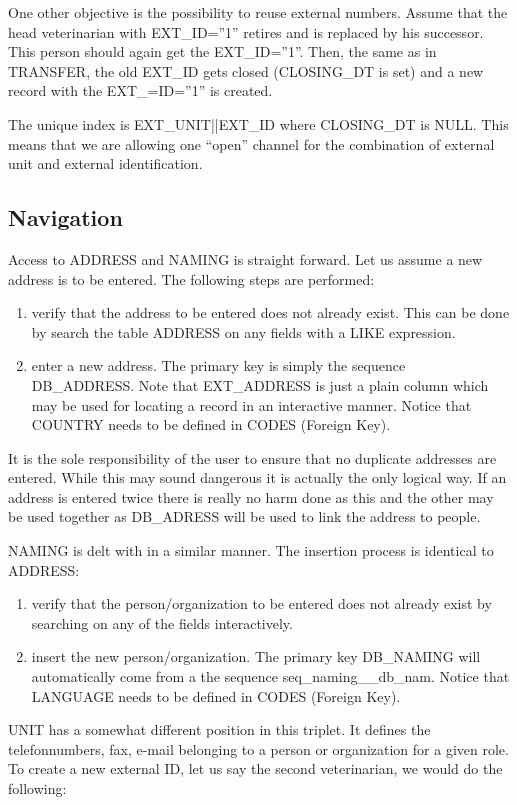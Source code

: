 One other objective is the possibility to reuse external numbers.
Assume that the head veterinarian with EXT\_ID=''1'' retires and
is replaced by his successor. This person should again get the EXT\_ID=''1''.
Then, the same as in TRANSFER, the old EXT\_ID gets closed (CLOSING\_DT
is set) and a new record with the EXT\_=ID=''1'' is created.

The unique index is EXT\_UNIT||EXT\_ID where CLOSING\_DT is NULL.
This means that we are allowing one {}``open'' channel for the combination
of external unit and external identification.


\subsection{Navigation}

Access to ADDRESS and NAMING is straight forward. Let us assume a
new address is to be entered. The following steps are performed:

\begin{enumerate}
\item verify that the address to be entered does not already exist. This
can be done by search the table ADDRESS on any fields with a LIKE
expression.
\item enter a new address. The primary key is simply the sequence DB\_ADDRESS.
Note that EXT\_ADDRESS is just a plain column which may be used for
locating a record in an interactive manner. Notice that COUNTRY needs
to be defined in CODES (Foreign Key).
\end{enumerate}
It is the sole responsibility of the user to ensure that no duplicate
addresses are entered. While this may sound dangerous it is actually
the only logical way. If an address is entered twice there is really
no harm done as this and the other may be used together as DB\_ADRESS
will be used to link the address to people.

NAMING is delt with in a similar manner. The insertion process is
identical to ADDRESS:

\begin{enumerate}
\item verify that the person/organization to be entered does not already
exist by searching on any of the fields interactively.
\item insert the new person/organization. The primary key DB\_NAMING will
automatically come from a the sequence seq\_naming\_\_db\_nam. Notice
that LANGUAGE needs to be defined in CODES (Foreign Key).
\end{enumerate}
UNIT has a somewhat different position in this triplet. It defines
the telefonnumbers, fax, e-mail belonging to a person or organization
for a given role. To create a new external ID, let us say the second
veterinarian, we would do the following:

